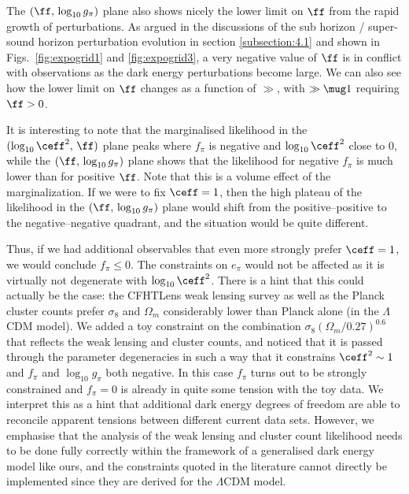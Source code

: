  The $(\ff,\, \log_{10}g_\pi)$ plane also shows nicely the lower limit on $\ff$ from the rapid growth of perturbations. As argued in the discussions of the sub horizon / super-sound horizon perturbation evolution in  section \ref{subsection:4.1} and shown in  Figs.\ \ref{fig:expogrid1} and \ref{fig:expogrid3}, a very negative value of $\ff$ is in conflict with observations as the dark energy perturbations become large. We can also see how the lower limit on $\ff$ changes as a function of $\gg$, with $\gg \mug 1$ requiring $\ff>0$. 
 
It is interesting to note that the marginalised likelihood in the $(\log_{10}\ceff^2,\, \ff)$ plane peaks where $f_\pi$ is negative and $\log_{10}\ceff^2$ close to 0, while the $(\ff,\, \log_{10}g_\pi)$ plane shows that the likelihood for negative $f_\pi$ is much lower than for positive $\ff$. Note that this is a volume effect of the marginalization. If we were to fix $\ceff=1$, then the high plateau of the likelihood in the $(\ff,\, \log_{10}g_\pi)$ plane would shift from the positive--positive to the negative--negative quadrant, and the situation would be quite different.

Thus, if we had additional observables that even more strongly prefer $\ceff=1$, we would conclude $f_\pi \leq 0$. The constraints on $e_\pi$ would not be affected as it is virtually not degenerate with $\log_{10}\ceff^2$. There is a hint that this could actually be the case: the CFHTLens weak lensing survey \cite{Kilbinger:2012qz} as well as the Planck cluster counts \cite{Ade:2013lmv} prefer $\sigma_8$ and $\Omega_m$ considerably lower than Planck alone (in the $\Lambda$CDM model). We added a toy constraint on the combination $\sigma_8(\Omega_m/0.27)^{0.6}$ that reflects the weak lensing and cluster counts, and noticed that it is passed through the parameter degeneracies in such a way that it constrains $\ceff^2 \sim 1$ and $f_\pi$ and $\log_{10}g_\pi$ both negative. In this case $f_\pi$ turns out to be strongly constrained and $f_\pi=0$ is already in quite some tension with the toy data. We interpret this as a hint that additional dark energy degrees of freedom are able to reconcile apparent tensions between different current data sets. However, we emphasise that the analysis of the weak lensing and cluster count likelihood needs to be done fully correctly within the framework of a generalised dark energy model like ours, and the constraints quoted in the literature \cite{Kilbinger:2012qz, Ade:2013lmv} cannot directly be implemented since they are derived for the $\Lambda$CDM model.


